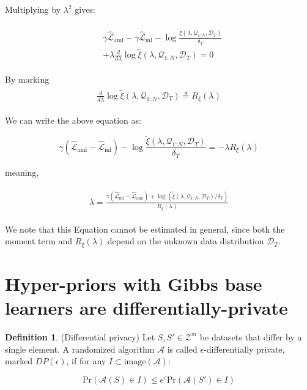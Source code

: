 \documentclass[letterpaper]{article} %
\theoremstyle{definition}
\newtheorem{defn}{Definition}[section]
\begin{document}
Multiplying by $\lambda^2$ gives:

\begin{align*} 
\begin{split}
&\gamma \hat{\mathcal{L}}_{\mathrm{aml}}-\gamma\hat{\mathcal{L}}_{\mathrm{ml}}-\log\frac{\tilde{\xi}(\lambda,\mathcal{Q}_{1:N},\mathcal{D}_T)}{\delta_T}\\
&+\lambda\frac{d}{d\lambda}\log\tilde{\xi}(\lambda,\mathcal{Q}_{1:N},\mathcal{D}_T)=0
\end{split}
\end{align*}


By marking 
\begin{align*} 
\begin{split}
\frac{d}{d\lambda}\log\tilde{\xi}(\lambda,\mathcal{Q}_{1:N},\mathcal{D}_T)\triangleq R_\xi(\lambda)
\end{split}
\end{align*}

We can write the above equation as:

$$\gamma(\hat{\mathcal{L}}_{\mathrm{aml}}-\hat{\mathcal{L}}_{\mathrm{ml}})-\log\frac{\tilde{\xi}(\lambda,\mathcal{Q}_{1:N},\mathcal{D}_T)}{\delta_T}=-\lambda R_\xi(\lambda)$$

meaning,

\begin{align} \label{eq:meta-pb-lambda}
\begin{split}
\lambda = \frac{\gamma(\hat{\mathcal{L}}_{\mathrm{ml}}-\hat{\mathcal{L}}_{\mathrm{aml}})+\log\left (\tilde{\xi}(\lambda,\mathcal{Q}_{1:N},\mathcal{D}_T)/\delta_T\right )}{R_\xi(\lambda)}
\end{split}
\end{align}

We note that this Equation cannot be estimated in general, since both the moment term and $ R_\xi(\lambda)$ depend on the unknown data distribution $\mathcal{D}_T$. 

\section{Hyper-priors with Gibbs base learners are differentially-private} \label{append:proof-dp}

\begin{defn} (Differential privacy)
	Let $S,S'\in \mathcal{Z}^m$ be datasets that differ by a single element.
	A randomized algorithm $\mathcal{A}$ is called  $\epsilon$-differentially private, marked $DP(\epsilon)$, if for any $I\subset \mathrm{image}(\mathcal{A})$:
	
	$$\mathrm{Pr}(\mathcal{A}(S)\in I)\leq e^\epsilon \mathrm{Pr}(\mathcal{A}(S')\in I)$$
\end{defn}
\end{document}
